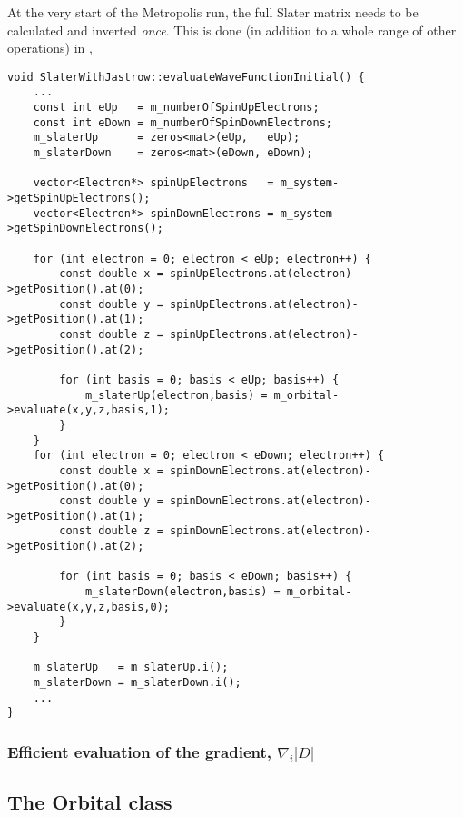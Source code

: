 \documentclass[../../master.tex]{subfiles}
\begin{document}
At the very start of the Metropolis run, the full Slater matrix needs to be calculated and inverted \emph{once}. This is done (in addition to a whole range of other operations) in ,
\begin{lstlisting}[language={[std]c++}]
void SlaterWithJastrow::evaluateWaveFunctionInitial() {
    ...
    const int eUp   = m_numberOfSpinUpElectrons;
    const int eDown = m_numberOfSpinDownElectrons;
    m_slaterUp      = zeros<mat>(eUp,   eUp);
    m_slaterDown    = zeros<mat>(eDown, eDown);

    vector<Electron*> spinUpElectrons   = m_system->getSpinUpElectrons();
    vector<Electron*> spinDownElectrons = m_system->getSpinDownElectrons();

    for (int electron = 0; electron < eUp; electron++) {
        const double x = spinUpElectrons.at(electron)->getPosition().at(0);
        const double y = spinUpElectrons.at(electron)->getPosition().at(1);
        const double z = spinUpElectrons.at(electron)->getPosition().at(2);

        for (int basis = 0; basis < eUp; basis++) {
            m_slaterUp(electron,basis) = m_orbital->evaluate(x,y,z,basis,1);
        }
    }
    for (int electron = 0; electron < eDown; electron++) {
        const double x = spinDownElectrons.at(electron)->getPosition().at(0);
        const double y = spinDownElectrons.at(electron)->getPosition().at(1);
        const double z = spinDownElectrons.at(electron)->getPosition().at(2);

        for (int basis = 0; basis < eDown; basis++) {
            m_slaterDown(electron,basis) = m_orbital->evaluate(x,y,z,basis,0);
        }
    }

    m_slaterUp   = m_slaterUp.i();
    m_slaterDown = m_slaterDown.i();
    ...
}
\end{lstlisting}

\subsubsection{Efficient evaluation of the gradient, $\nabla_i |D|$}



\subsection{The Orbital class \label{orbital}}
\end{document}
